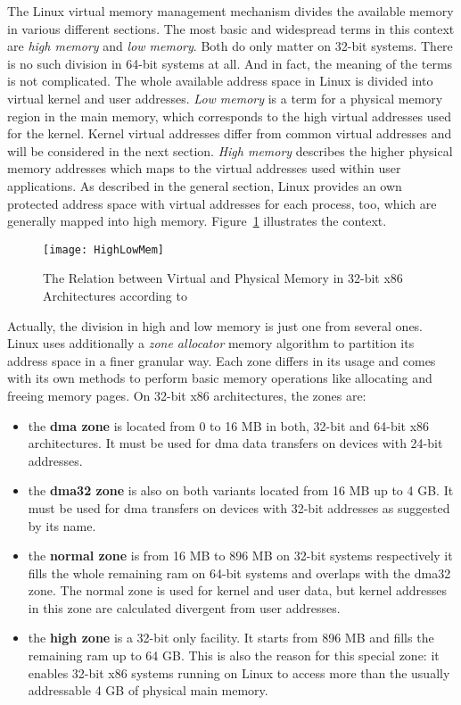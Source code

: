 The Linux virtual memory management mechanism divides the available memory in various different sections.
The most basic and widespread terms in this context are \textit{high memory} and \textit{low memory}.
Both do only matter on 32-bit systems.
There is no such division in 64-bit systems at all.
And in fact, the meaning of the terms is not complicated.
The whole available address space in Linux is divided into virtual kernel and user addresses.
\textit{Low memory} is a term for a physical memory region in the main memory, which corresponds to the high virtual addresses used for the kernel. 
Kernel virtual addresses differ from common virtual addresses and will be considered in the next section.
\textit{High memory} describes the higher physical memory addresses which maps to the virtual addresses used within user applications.
As described in the general section, Linux provides an own protected address space with virtual addresses for each process, too, which are generally mapped into high memory\cite{lfd430}.
Figure~\ref{pic:high-low-mem} illustrates the context.

\begin{figure} [t]
	\centering
	\texttt{[image: HighLowMem]}
	\caption{The Relation between Virtual and Physical Memory in 32-bit x86 Architectures according to~\cite{lfd430}}\label{pic:high-low-mem}
\end{figure}
%
Actually, the division in high and low memory is just one from several ones. 
Linux uses additionally a \textit{zone allocator} memory algorithm to partition its address space in a finer granular way.
Each zone differs in its usage and comes with its own methods to perform basic memory operations like allocating and freeing memory pages\cite{lfd430}.
On 32-bit x86 architectures, the zones are:
\begin{itemize}
    \item the \textbf{\ac{dma} zone} is located from 0 to 16 MB in both, 32-bit and 64-bit x86 architectures. It must be used for \ac{dma} data transfers on devices with 24-bit addresses.
    \item the \textbf{\ac{dma}32 zone} is also on both variants located from 16 MB up to 4 GB\@. It must be used for \ac{dma} transfers on devices with 32-bit addresses as suggested by its name.
    \item the \textbf{normal zone} is from 16 MB to 896 MB on 32-bit systems respectively it fills the whole remaining \ac{ram} on 64-bit systems and overlaps with the \ac{dma}32 zone. The normal zone is used for kernel and user data, but kernel addresses in this zone are calculated divergent from user addresses.
    \item the \textbf{high zone} is a 32-bit only facility. It starts from 896 MB and fills the remaining \ac{ram} up to 64 GB\@. This is also the reason for this special zone: it enables 32-bit x86 systems running on Linux to access more than the usually addressable 4 GB of physical main memory\cite{lfd430}.
\end{itemize}

